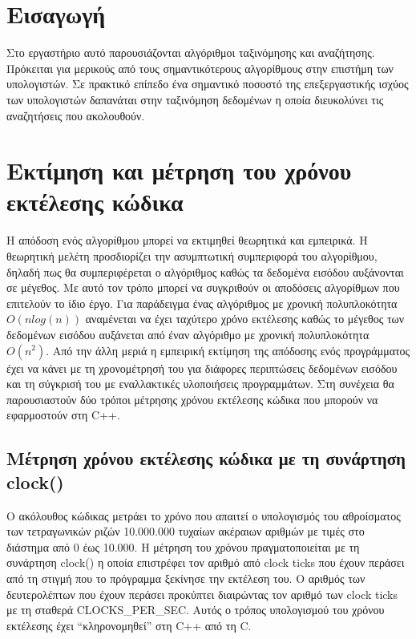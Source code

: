 \section{Εισαγωγή}
Στο εργαστήριο αυτό παρουσιάζονται αλγόριθμοι ταξινόμησης και αναζήτησης. Πρόκειται για μερικούς από τους σημαντικότερους αλγορίθμους στην επιστήμη των υπολογιστών. Σε πρακτικό επίπεδο ένα σημαντικό ποσοστό της επεξεργαστικής ισχύος των υπολογιστών δαπανάται στην ταξινόμηση δεδομένων η οποία διευκολύνει τις αναζητήσεις που ακολουθούν. 
  

\section{Εκτίμηση και μέτρηση του χρόνου εκτέλεσης κώδικα}
Η απόδοση ενός αλγορίθμου μπορεί να εκτιμηθεί θεωρητικά και εμπειρικά. Η θεωρητική μελέτη προσδιορίζει την ασυμπτωτική συμπεριφορά του αλγορίθμου, δηλαδή πως θα συμπεριφέρεται ο αλγόριθμος καθώς τα δεδομένα εισόδου αυξάνονται σε μέγεθος. Με αυτό τον τρόπο μπορεί να συγκριθούν οι αποδόσεις αλγορίθμων που επιτελούν το ίδιο έργο. Για παράδειγμα ένας αλγόριθμος με χρονική πολυπλοκότητα $O(nlog(n))$ αναμένεται να έχει ταχύτερο χρόνο εκτέλεσης καθώς το μέγεθος των δεδομένων εισόδου αυξάνεται από έναν αλγόριθμο με χρονική πολυπλοκότητα $O(n^2)$. Από την άλλη μεριά η εμπειρική εκτίμηση της απόδοσης ενός προγράμματος έχει να κάνει με τη χρονομέτρησή του για διάφορες περιπτώσεις δεδομένων εισόδου και τη σύγκρισή του με εναλλακτικές υλοποιήσεις προγραμμάτων. Στη συνέχεια θα παρουσιαστούν δύο τρόποι μέτρησης χρόνου εκτέλεσης κώδικα που μπορούν να εφαρμοστούν στη C++.

\subsection{Μέτρηση χρόνου εκτέλεσης κώδικα με τη συνάρτηση clock()}
Ο ακόλουθος κώδικας μετράει το χρόνο που απαιτεί ο υπολογισμός του αθροίσματος των τετραγωνικών ριζών 10.000.000 τυχαίων ακέραιων αριθμών με τιμές στο διάστημα από 0  έως 10.000. Η μέτρηση του χρόνου πραγματοποιείται με τη συνάρτηση clock() η οποία επιστρέφει τον αριθμό από clock ticks που έχουν περάσει από τη στιγμή που το πρόγραμμα ξεκίνησε την εκτέλεση του. Ο αριθμός των δευτερολέπτων που έχουν περάσει προκύπτει διαιρώντας τον αριθμό των clock ticks με τη σταθερά CLOCKS\_PER\_SEC. Αυτός ο τρόπος υπολογισμού του χρόνου εκτέλεσης έχει ``κληρονομηθεί'' στη C++ από τη C.



